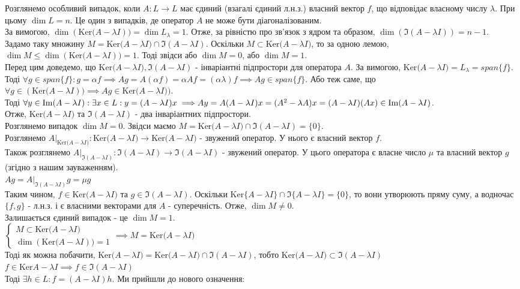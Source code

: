 \documentclass[a4paper, 10pt]{article}
\def\ker#1{\textrm{Ker} {#1}}
\theoremstyle{theoremdd}
\theoremstyle{theoremdd}
\theoremstyle{theoremdd}
\theoremstyle{theoremdd}
\theoremstyle{theoremdd}
\theoremstyle{theoremdd}
\theoremstyle{theoremdd}
\theoremstyle{theoremdd}
\begin{document}
\iffalse
Розглянемо особливий випадок, коли $A: L \to L$ має єдиний (взагалі єдиний л.н.з.) власний вектор $f$, що відповідає власному числу $\lambda$. При цьому $\dim L = n$. Це один з випадків, де оператор $A$ не може бути діагоналізованим.\\
За вимогою, $\dim (\ker(A - \lambda I)) = \dim L_{\lambda} = 1$. Отже, за рівністю про зв'язок з ядром та образом, $\dim (\Im (A - \lambda I)) = n-1$.\\
Задамо таку множину $M=\ker(A-\lambda I) \cap \Im(A-\lambda I)$. Оскільки $M \subset \ker (A-\lambda I)$, то за одною лемою, $\dim M \leq \dim(\ker (A-\lambda I)) = 1$.
Тоді звідси або $\dim M = 0$, або $\dim M = 1$.
\bigskip \\
Перед цим доведемо, що $\ker(A - \lambda I), \Im(A-\lambda I)$ - інваріантні підпростори для оператора $A$. За вимогою, $\ker(A-\lambda I) = L_{\lambda} = span\{f\}$.\\
Тоді $\forall g \in span\{f\}: g = \alpha f \implies Ag = A(\alpha f) = \alpha Af = (\alpha \lambda) f \implies Ag \in span\{f\}$. Або теж саме, що $\forall g \in (\ker(A - \lambda I)) \implies Ag \in  \ker(A - \lambda I))$.
\bigskip \\
Тоді $\forall y \in \Im(A-\lambda I): \exists x \in L: y = (A-\lambda I)x \implies \\ Ay = A(A-\lambda I)x = (A^2-\lambda A)x = (A-\lambda I)(Ax) \in \Im(A-\lambda I)$.\\
Отже, $\ker(A-\lambda I)$ та $\Im(A-\lambda I)$ - два інваріантних підпростори.
\bigskip \\
Розглянемо випадок $\dim M = 0$. Звідси маємо $M = \ker(A-\lambda I) \cap \Im(A-\lambda I) = \{0\}$.\\
Розглянемо $A |_{\ker(A-\lambda I)}: \ker(A-\lambda I) \to \ker(A-\lambda I)$ - звужений оператор. У нього є власний вектор $f$.\\
Також розглянемо $A |_{\Im(A-\lambda I)}: \Im(A-\lambda I) \to \Im(A-\lambda I)$ - звужений оператор. У цього оператора є власне число $\mu$ та власний вектор $g$ (згідно з нашим зауваженням).\\
$Ag = A |_{\Im(A-\lambda I)} g = \mu g$\\
Таким чином, $f \in \ker(A-\lambda I)$ та $g \in \Im(A-\lambda I)$. Оскільки $\ker \{ A-\lambda I \} \cap \Im \{ A - \lambda I \} = \{ 0 \}$, то вони утворюють пряму суму, а водночас $\{f,g\}$ - л.н.з. і є власними векторами для $A$ - суперечність. Отже, $\dim M \neq 0$.
\bigskip \\
Залишається єдиний випадок - це $\dim M = 1$.\\
$\begin{cases}
M \subset \ker(A-\lambda I)\\
\dim{(\ker(A-\lambda I))} = 1
\end{cases}
\implies M = \ker(A-\lambda I)$
\bigskip \\
Тоді як можна побачити, $\ker(A-\lambda I) = \ker(A-\lambda I) \cap \Im (A - \lambda I)$, тобто $\ker(A-\lambda I) \subset \Im(A-\lambda I)$\\
$f \in \ker{A- \lambda I} \implies f \in \Im(A - \lambda I)$\\
Тоді $\exists h \in L: f = (A-\lambda I)h$. Ми прийшли до нового означення:
\end{document}
